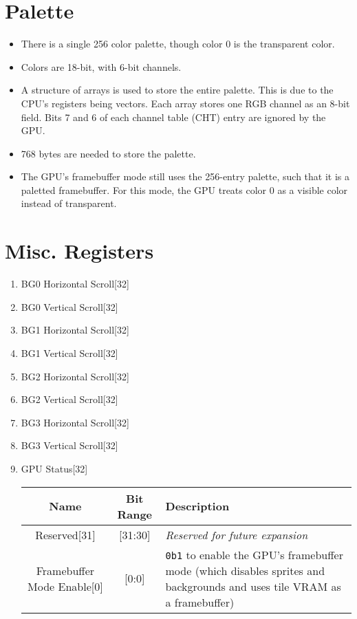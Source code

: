 \documentclass{article}
\begin{document}
\section{Palette}
	\begin{itemize}
	\item There is a single 256 color palette, though color 0 is the
	transparent color.

	\item Colors are 18-bit, with 6-bit channels.

	\item A structure of arrays is used to store the entire palette.  This
	is due to the CPU's registers being vectors. Each array stores one RGB
	channel as an 8-bit field.  Bits 7 and 6 of each channel table (CHT)
	entry are ignored by the GPU.

	\item 768 bytes are needed to store the palette. 

	\item The GPU's framebuffer mode still uses the 256-entry palette, such
	that it is a paletted framebuffer.  For this mode, the GPU treats color
	0 as a visible color instead of transparent.
	\end{itemize}
	\newpage

\section{Misc. Registers}
	\begin{enumerate}
	\item BG0 Horizontal Scroll[32]
	\item BG0 Vertical Scroll[32]

	\item BG1 Horizontal Scroll[32]
	\item BG1 Vertical Scroll[32]

	\item BG2 Horizontal Scroll[32]
	\item BG2 Vertical Scroll[32]

	\item BG3 Horizontal Scroll[32]
	\item BG3 Vertical Scroll[32]

	\item GPU Status[32]
		\begin{table}[H]
			\begin{center}
				\begin{tabular}{|c|c|p{65mm}|}
					\hline
					\textbf{Name} & \textbf{Bit Range}
						& \textbf{Description}\\
					\hline
					Reserved[31] & [31:30]
						& \textit{Reserved for future expansion}\\
					Framebuffer Mode Enable[0] & [0:0]
						& \texttt{0b1} to enable the GPU's framebuffer mode
						(which disables sprites and backgrounds and uses
						tile VRAM as a framebuffer)\\
					\hline
				\end{tabular}
			\end{center}
		\end{table}
	\end{enumerate}
	\newpage
\end{document}
